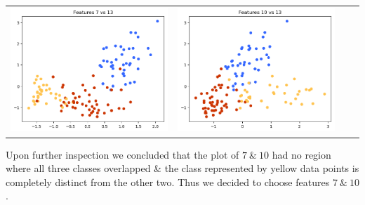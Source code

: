 \documentclass[11pt,a4paper]{article}
\begin{document}
\begin{tabular}{cccc}
\includegraphics[scale=0.3]{img/7x13.png}&
\includegraphics[scale=0.3]{img/10x13.png}
\end{tabular}
Upon further inspection we concluded that the plot of $7\ \&\ 10$ had no region where all three classes overlapped \& the class represented by yellow data points is completely distinct from the other two. Thus we decided to choose features $7\ \&\ 10$.
\end{document}
